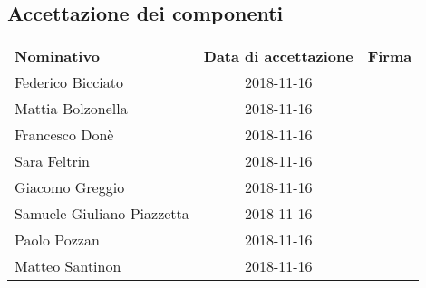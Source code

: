 \subsection{Accettazione dei componenti}
\begin{table}[H]
	\centering\renewcommand{\arraystretch}{1.5}
	
	\begin{tabular}{l c c}
		
		
		\rowcolorhead 
		{ \textbf{Nominativo}} &
		{ \textbf{Data di accettazione}} &
		{ \textbf{Firma}}  \\
		
		\rowcolorlight
		Federico Bicciato & 2018-11-16 &   \\ 
		\rowcolordark
		Mattia Bolzonella & 2018-11-16 &   \\ 
		\rowcolorlight
		Francesco Donè & 2018-11-16 &   \\ 
		\rowcolordark
		Sara Feltrin & 2018-11-16 &   \\ 
		\rowcolorlight
		Giacomo Greggio & 2018-11-16 &   \\ 
		\rowcolordark
		Samuele Giuliano Piazzetta & 2018-11-16 &   \\ 
		\rowcolorlight
		Paolo Pozzan & 2018-11-16 &   \\ 
		\rowcolordark
		Matteo Santinon & 2018-11-16 &   \\ 
	\end{tabular}
\end{table}

